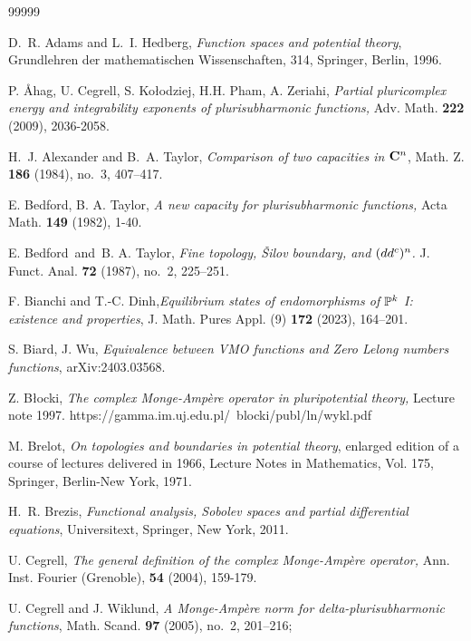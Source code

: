 \documentclass{amsart}
\theoremstyle{definition}
\numberwithin{thm}{section}
\numberwithin{equation}{section}
\renewcommand{\[}{\begin{equation}}
\renewcommand{\]}{\end{equation}}
\begin{document}
\begin{thebibliography}{99999}

 D.~R. Adams and L.~I. Hedberg, {\it Function spaces and potential theory}, Grundlehren der mathematischen Wissenschaften, 314, Springer, Berlin, 1996.

 P. \AA hag, U. Cegrell, S. Ko\l odziej, H.H. Pham, A. Zeriahi, 
{\it Partial pluricomplex energy and integrability exponents of plurisubharmonic functions,} Adv. Math. {\bf 222} (2009), 2036-2058.

H.~J. Alexander and B.~A. Taylor, {\it Comparison of two capacities in ${\bf C}\sp{n}$}, Math. Z. {\bf 186} (1984), no.~3, 407--417.

 E. Bedford, B. A. Taylor, 
{\it A new capacity for plurisubharmonic functions,} Acta Math. {\bf149} (1982), 1-40.

 E. Bedford\ and\ B. A. Taylor, {\it Fine topology, \v Silov boundary, and $(dd\sp c)\sp n$.} J. Funct. Anal. {\bf 72} (1987), no.~2, 225--251.

F. Bianchi and T.-C. Dinh,{\it  Equilibrium states of endomorphisms of $\Bbb P ^k$ I: existence and properties}, J. Math. Pures Appl. (9) {\bf 172} (2023), 164--201.

 S. Biard, J. Wu, {\it Equivalence between VMO functions and Zero Lelong numbers functions}, arXiv:2403.03568.

  Z. B\l ocki, {\it The complex Monge-Amp\`ere operator in pluripotential theory,} Lecture note 1997.
https://gamma.im.uj.edu.pl/~blocki/publ/ln/wykl.pdf

M. Brelot, {\it On topologies and boundaries in potential theory}, enlarged edition of a course of lectures delivered in 1966, 
Lecture Notes in Mathematics, Vol. 175, Springer, Berlin-New York, 1971.

H.~R. Brezis, {\it Functional analysis, Sobolev spaces and partial differential equations}, Universitext, Springer, New York, 2011.

 U. Cegrell,
{\it The general definition of the complex Monge-Amp\`ere operator,}
Ann. Inst. Fourier (Grenoble), {\bf 54} (2004), 159-179.

U. Cegrell and J. Wiklund, {\it A Monge-Amp\`ere norm for delta-plurisubharmonic functions}, Math. Scand. {\bf 97} (2005), no.~2, 201--216;


\end{thebibliography}
\end{document}
